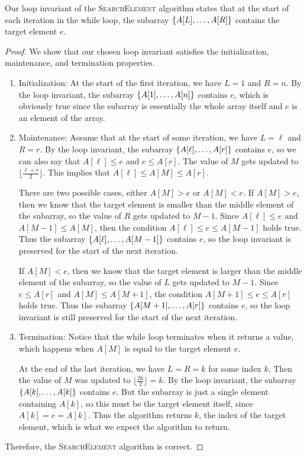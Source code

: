 \begin{example}
    Our loop invariant of the \textsc{SearchElement} algorithm states that at the start of each iteration in the while loop, the subarray $\left\{A[L],\ldots,A[R]\right\}$ contains the target element $e$.

    \begin{proof}
        We show that our chosen loop invariant satisfies the initialization, maintenance, and termination properties.

        \begin{enumerate}
            \item Initialization: At the start of the first iteration, we have $L=1$ and $R=n$. By the loop invariant, the subarray $\left\{A[1],\ldots,A[n]\right\}$ contains $e$, which is obviously true since the subarray is essentially the whole array itself and $e$ is an element of the array.
            \item Maintenance: Assume that at the start of some iteration, we have $L=\ell$ and $R = r$. By the loop invariant, the subarray $\left\{A[\ell],\ldots,A[r]\right\}$ contains $e$, so we can also say that $A[\ell] \le e$ and $e \le A[r]$. The value of $M$ gets updated to $\lfloor\frac{\ell+r}{2}\rfloor$. This implies that $A[\ell] \le A[M] \le A[r]$. 
                
                There are two possible cases, either $A[M] > e$ or $A[M] < e$. If $A[M] > e$, then we know that the target element is smaller than the middle element of the subarray, so the value of $R$ gets updated to $M-1$. Since $A[\ell] \le e$ and $A[M-1] \le A[M]$, then the condition $A[\ell] \le e \le A[M-1]$ holds true. Thus the subarray $\left\{A[\ell],\ldots,A[M-1]\right\}$ contains $e$, so the loop invariant is preserved for the start of the next iteration.

                If $A[M] < e$, then we know that the target element is larger than the middle element of the subarray, so the value of $L$ gets updated to $M-1$. Since $e \le A[r]$ and $A[M] \le A[M+1]$, the condition $A[M+1] \le e \le A[r]$ holds true. Thus the subarray $\left\{A[M+1],\ldots,A[r]\right\}$ contains $e$, so the loop invariant is still preserved for the start of the next iteration.

            \item Termination: Notice that the while loop terminates when it returns a value, which happens when $A[M]$ is equal to the target element $e$. 

                At the end of the last iteration, we have $L = R = k$ for some index $k$. Then the value of $M$ was updated to $\lfloor\frac{2k}{2}\rfloor = k$. By the loop invariant, the subarray $\left\{A[k],\ldots,A[k]\right\}$ contains $e$. But the subarray is just a single element containing $A[k]$, so this must be the target element itself, since $A[k] = e = A[k]$. Thus the algorithm returns $k$, the index of the target element, which is what we expect the algorithm to return.
        \end{enumerate}

        Therefore, the \textsc{SearchElement} algorithm is correct.
    \end{proof}
\end{example}

